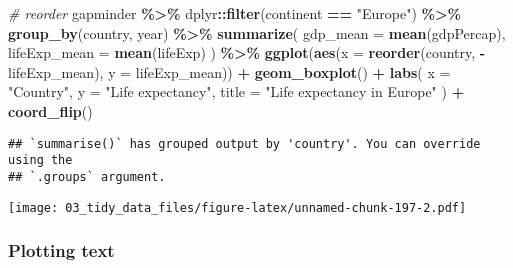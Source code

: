 \documentclass[
]{book}
\newenvironment{Shaded}{\begin{snugshade}}{\end{snugshade}}
\newcommand{\CommentTok}[1]{\textcolor[rgb]{0.56,0.35,0.01}{\textit{#1}}}
\newcommand{\DataTypeTok}[1]{\textcolor[rgb]{0.13,0.29,0.53}{#1}}
\newcommand{\KeywordTok}[1]{\textcolor[rgb]{0.13,0.29,0.53}{\textbf{#1}}}
\newcommand{\NormalTok}[1]{#1}
\newcommand{\OperatorTok}[1]{\textcolor[rgb]{0.81,0.36,0.00}{\textbf{#1}}}
\newcommand{\StringTok}[1]{\textcolor[rgb]{0.31,0.60,0.02}{#1}}
\begin{document}
\begin{Shaded}
\begin{Highlighting}[]
\CommentTok{\# reorder}
\NormalTok{gapminder }\OperatorTok{\%\textgreater{}\%}
\StringTok{  }\NormalTok{dplyr}\OperatorTok{::}\KeywordTok{filter}\NormalTok{(continent }\OperatorTok{==}\StringTok{ "Europe"}\NormalTok{) }\OperatorTok{\%\textgreater{}\%}
\StringTok{  }\KeywordTok{group\_by}\NormalTok{(country, year) }\OperatorTok{\%\textgreater{}\%}
\StringTok{  }\KeywordTok{summarize}\NormalTok{(}
    \DataTypeTok{gdp\_mean =} \KeywordTok{mean}\NormalTok{(gdpPercap),}
    \DataTypeTok{lifeExp\_mean =} \KeywordTok{mean}\NormalTok{(lifeExp)}
\NormalTok{  ) }\OperatorTok{\%\textgreater{}\%}
\StringTok{  }\KeywordTok{ggplot}\NormalTok{(}\KeywordTok{aes}\NormalTok{(}\DataTypeTok{x =} \KeywordTok{reorder}\NormalTok{(country, }\OperatorTok{{-}}\NormalTok{lifeExp\_mean), }\DataTypeTok{y =}\NormalTok{ lifeExp\_mean)) }\OperatorTok{+}
\StringTok{  }\KeywordTok{geom\_boxplot}\NormalTok{() }\OperatorTok{+}
\StringTok{  }\KeywordTok{labs}\NormalTok{(}
    \DataTypeTok{x =} \StringTok{"Country"}\NormalTok{,}
    \DataTypeTok{y =} \StringTok{"Life expectancy"}\NormalTok{,}
    \DataTypeTok{title =} \StringTok{"Life expectancy in Europe"}
\NormalTok{  ) }\OperatorTok{+}
\StringTok{  }\KeywordTok{coord\_flip}\NormalTok{()}
\end{Highlighting}
\end{Shaded}

\begin{verbatim}
## `summarise()` has grouped output by 'country'. You can override using the
## `.groups` argument.
\end{verbatim}

\texttt{[image: 03\_tidy\_data\_files/figure-latex/unnamed-chunk-197-2.pdf]}

\hypertarget{plotting-text}{%
\subsubsection{Plotting text}\label{plotting-text}}
\end{document}
